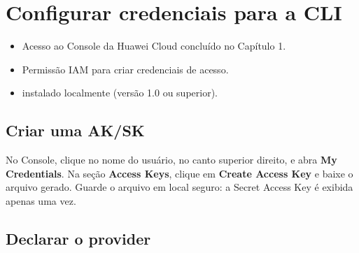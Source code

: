 \documentclass{labguide}
\begin{document}
\section{Configurar credenciais para a CLI}

\begin{objetivos}

  \prerequisitos
  \begin{itemize}
    \item Acesso ao Console da Huawei Cloud concluído no Capítulo 1.
    \item Permissão IAM para criar credenciais de acesso.
    \item {} instalado localmente (versão 1.0 ou superior).
  \end{itemize}
\end{objetivos}

\subsection{Criar uma AK/SK}


No Console, clique no nome do usuário, no canto superior direito, e abra
\textbf{My Credentials}. Na seção \textbf{Access Keys}, clique em
\textbf{Create Access Key} e baixe o arquivo gerado. Guarde o arquivo em local
seguro: a Secret Access Key é exibida apenas uma vez.

\subsection{Declarar o provider}
\end{document}
